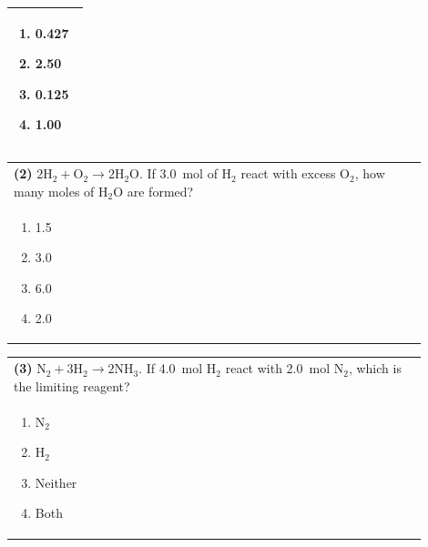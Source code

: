 \documentclass{article}
\begin{document}
{{\begin{tabular}{|p{0.9\linewidth}|}
\begin{minipage}[t]{0.85\linewidth}
\begin{enumerate}[label=\alph*.]
\item 0.427
\item 2.50
\item 0.125
\item 1.00
\end{enumerate}
\end{minipage}\\[0.2cm]
\hline
\end{tabular}

\vspace{0.2cm}
\noindent\begin{tabular}{|p{0.9\linewidth}|}
\hline
\textbf{(2)} $2\text{H}_2 + \text{O}_2 \rightarrow 2\text{H}_2\text{O}$. If 3.0~mol of H$_2$ react with excess O$_2$, how many moles of H$_2$O are formed?\\[0.2cm]

\begin{minipage}[t]{0.85\linewidth}
\begin{enumerate}[label=\alph*.]
\item 1.5
\item 3.0
\item 6.0
\item 2.0
\end{enumerate}
\end{minipage}\\[0.2cm]
\hline
\end{tabular}

\vspace{0.2cm}
\noindent\begin{tabular}{|p{0.9\linewidth}|}
\hline
\textbf{(3)} $\text{N}_2 + 3\text{H}_2 \rightarrow 2\text{NH}_3$. If 4.0~mol H$_2$ react with 2.0~mol N$_2$, which is the limiting reagent?\\[0.2cm]

\begin{minipage}[t]{0.85\linewidth}
\begin{enumerate}[label=\alph*.]
\item N$_2$
\item H$_2$
\item Neither
\item Both
\end{enumerate}
\end{minipage}\\[0.2cm]
\hline
\end{tabular}

}}
\end{document}
